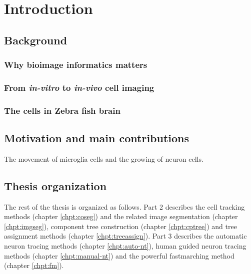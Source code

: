 \chapter{Introduction}
\section{Background}
\subsection{Why bioimage informatics matters}
\subsection{From \emph{in-vitro} to \emph{in-vivo} cell imaging}
\subsection{The cells in Zebra fish brain}
\section{Motivation and main contributions}
The movement of microglia cells and the growing of neuron cells.
\section{Thesis organization}
The rest of the thesis is organized as follows. Part 2 describes the cell tracking methods (chapter \ref{chpt:coseg}) and the related image segmentation (chapter \ref{chpt:imgseg}), component tree construction (chapter \ref{chpt:cptree}) and tree assignment methods (chapter \ref{chpt:treeassign}). Part 3 describes the automatic neuron tracing methods (chapter \ref{chpt:auto-nt}), human guided neuron tracing methods (chapter \ref{chpt:manual-nt}) and the powerful fastmarching method (chapter \ref{chpt:fm}).

